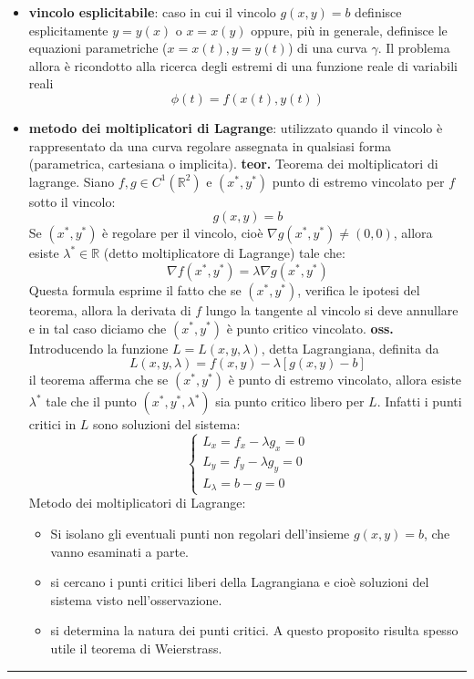 \begin{tcolorbox}
\begin{itemize}
    \item \textbf{vincolo esplicitabile}: caso in cui il vincolo $g(x,y) = b$ definisce esplicitamente $y=y(x)$ o $x = x(y)$ oppure, più in generale, definisce le equazioni parametriche ($x= x(t), y = y(t)$) di una curva $\gamma$. Il problema allora è ricondotto alla ricerca degli estremi di una funzione reale di variabili reali
    \[
        \phi(t) = f(x(t), y(t))
    \]
    \item \textbf{metodo dei moltiplicatori di Lagrange}: utilizzato quando il vincolo è rappresentato da una curva regolare assegnata in qualsiasi forma (parametrica, cartesiana o implicita).\newline
    \textbf{teor.} Teorema dei moltiplicatori di lagrange. Siano $f,g \in C^1(\mathbb{R}^2)$ e $(x^*, y^*)$ punto di estremo vincolato per $f$ sotto il vincolo:
    \[
        g(x,y) = b
    \]
    Se $(x^*, y^*)$ è regolare per il vincolo, cioè $\nabla g(x^*, y^*) \neq (0,0)$, allora esiste $\lambda^* \in \mathbb{R}$ (detto moltiplicatore di Lagrange) tale che:
    \[
        \nabla f(x^*, y^*) = \lambda \nabla g(x^*, y^*)
    \]
    Questa formula esprime il fatto che se $(x^*, y^*)$, verifica le ipotesi del teorema, allora la derivata di $f$ lungo la tangente al vincolo si deve annullare e in tal caso diciamo che $(x^*, y^*)$ è punto critico vincolato.\newline
    \textbf{oss.} Introducendo la funzione $L = L (x, y , \lambda)$, detta Lagrangiana, definita da
    \[
        L(x,y,\lambda) = f(x,y) - \lambda[g(x,y) - b]
    \] 
    il teorema afferma che se $(x^*, y^*)$ è punto di estremo vincolato, allora esiste $\lambda^*$ tale che il punto $(x^*, y^*, \lambda^*)$ sia punto critico libero per $L$. Infatti i punti critici in $L$ sono soluzioni del sistema:
    \[
        \begin{cases}
            L_x = f_x - \lambda g_x  = 0\\
            L_y = f_y - \lambda g_y = 0\\
            L_\lambda = b-g = 0
        \end{cases}
    \]
    Metodo dei moltiplicatori di Lagrange:
    \begin{itemize}
        \item Si isolano gli eventuali punti non regolari dell'insieme $g(x,y) = b$, che vanno esaminati a parte.
        \item si cercano i punti critici liberi della Lagrangiana e cioè soluzioni del sistema visto nell'osservazione.
        \item si determina la natura dei punti critici. A questo proposito risulta spesso utile il teorema di Weierstrass.
    \end{itemize}
\end{itemize}
\end{tcolorbox}
\rule{\textwidth}{0,4pt}
